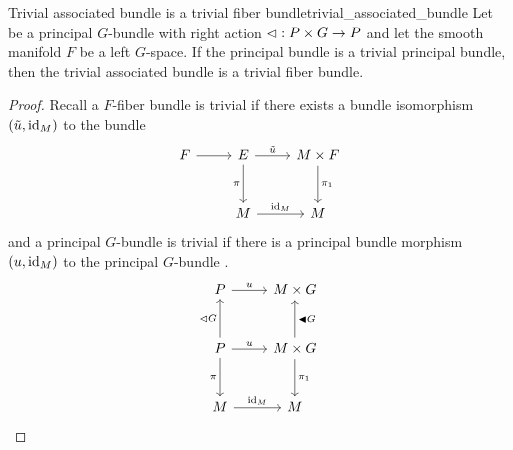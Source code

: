 \begin{theorem}{Trivial associated bundle is a trivial fiber bundle}{trivial_associated_bundle}
    Let  be a principal \(G\)-bundle with right action \(\mathbin{\vartriangleleft} : P \times G \to P\) and let the smooth manifold \(F\) be a left \(G\)-space. If the principal bundle  is a trivial principal bundle, then the trivial associated bundle  is a trivial fiber bundle.
\end{theorem}
\begin{proof}
    Recall a \(F\)-fiber bundle  is trivial if there exists a bundle isomorphism \((\tilde{u}, \operatorname{id}_{M})\) to the bundle 
\begin{equation*}
    \begin{tikzcd}[column sep = normal, row sep = large]
        F \arrow{r}{} & E \arrow[swap]{d}{\pi} \arrow{r}{\tilde{u}} & M \times F \arrow{d}{\pi_1}\\
                      & M \arrow{r}{\id{M}} & M
    \end{tikzcd}
\end{equation*}
and a principal \(G\)-bundle  is trivial if there is a principal bundle morphism \((u, \operatorname{id}_{M})\) to the principal \(G\)-bundle .
\begin{equation*}
    \begin{tikzcd}[column sep = normal, row sep = large]
        P \arrow{r}{u} & M \times G\\
        P \arrow{u}{\ract G} \arrow{r}{u} \arrow[swap]{d}{\pi} & M\times G \arrow[swap]{u}{\ractalt G} \arrow{d}{\pi_1}\\
        M \arrow{r}{\id{M}} & M
    \end{tikzcd}
\end{equation*}

\end{proof}

